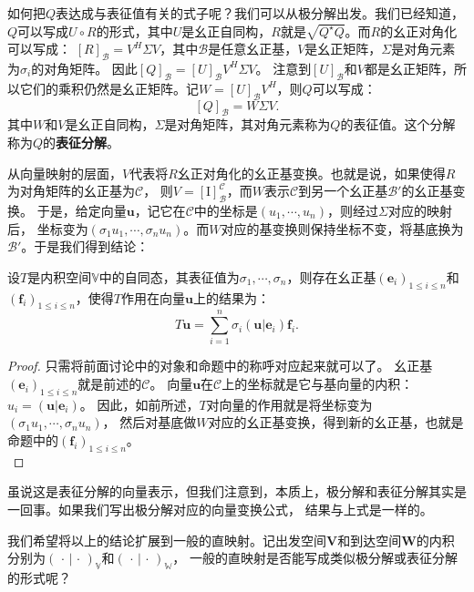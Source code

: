 \documentclass[12pt,UTF8,fontset=none]{ctexbook}
\begin{document}
如何把$Q$表达成与表征值有关的式子呢？我们可以从极分解出发。我们已经知道，
$Q$可以写成$U\circ R$的形式，其中$U$是幺正自同构，$R$就是$\sqrt{Q^\star Q}$。而$R$的幺正对角化可以写成：
$[R]_\mathcal{B} = V^H \Sigma V$，其中$\mathcal{B}$是任意幺正基，$V$是幺正矩阵，$\Sigma$是对角元素为$\sigma_i$的对角矩阵。
因此$[Q]_\mathcal{B} = [U]_\mathcal{B} V^H \Sigma V$。
注意到$[U]_\mathcal{B}$和$V$都是幺正矩阵，所以它们的乘积仍然是幺正矩阵。记$W = [U]_\mathcal{B}V^H$，则$Q$可以写成：
$$ [Q]_\mathcal{B} = W \Sigma V. $$
其中$W$和$V$是幺正自同构，$\Sigma$是对角矩阵，其对角元素称为$Q$的表征值。这个分解称为$Q$的\textbf{表征分解}。

从向量映射的层面，$V$代表将$R$幺正对角化的幺正基变换。也就是说，如果使得$R$为对角矩阵的幺正基为$\mathcal{C}$，
则$V = [\mathrm{I}]_\mathcal{B}^\mathcal{C}$，而$W$表示$\mathcal{C}$到另一个幺正基$\mathcal{B}'$的幺正基变换。
于是，给定向量$\mathbf{u}$，记它在$\mathcal{C}$中的坐标是$(u_1, \cdots, u_n)$，则经过$\Sigma$对应的映射后，
坐标变为$(\sigma_1 u_1, \cdots, \sigma_n u_n)$。而$W$对应的基变换则保持坐标不变，将基底换为$\mathcal{B}'$。于是我们得到结论：
\begin{pp}\label{pp:8_15}
    设$T$是内积空间$\mathbb{V}$中的自同态，其表征值为$\sigma_1 , \cdots , \sigma_n$，则存在幺正基$(\mathbf{e}_i)_{1\leqslant i \leqslant n}$和
    $(\mathbf{f}_i)_{1\leqslant i \leqslant n}$，使得$T$作用在向量$\mathbf{u}$上的结果为：
    $$ T\mathbf{u} = \sum_{i=1}^n \sigma_i (\mathbf{u} | \mathbf{e}_i) \mathbf{f}_i.$$
\end{pp}
\begin{proof} %
    只需将前面讨论中的对象和命题中的称呼对应起来就可以了。
    幺正基$(\mathbf{e}_i)_{1\leqslant i \leqslant n}$就是前述的$\mathcal{C}$。
    向量$\mathbf{u}$在$\mathcal{C}$上的坐标就是它与基向量的内积：$u_i = (\mathbf{u} | \mathbf{e}_i)$。
    因此，如前所述，$T$对向量的作用就是将坐标变为$(\sigma_1 u_1, \cdots, \sigma_n u_n)$，
    然后对基底做$W$对应的幺正基变换，得到新的幺正基，也就是命题中的$(\mathbf{f}_i)_{1\leqslant i \leqslant n}$。\\
\end{proof}

虽说这是表征分解的向量表示，但我们注意到，本质上，极分解和表征分解其实是一回事。如果我们写出极分解对应的向量变换公式，
结果与上式是一样的。

我们希望将以上的结论扩展到一般的直映射。记出发空间$\mathbf{V}$和到达空间$\mathbf{W}$的内积分别为$(\,\cdot\,|\,\cdot\,)_\mathbb{V}$和$(\,\cdot\,|\,\cdot\,)_\mathbb{W}$，
一般的直映射是否能写成类似极分解或表征分解的形式呢？
\end{document}
